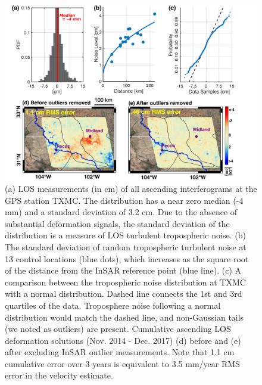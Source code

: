 \documentclass{utexasthesis}
\begin{document}
\begin{figure}[hbt!]
	\centering
	\includegraphics[width=0.95\linewidth]{paper1-permian/figures/figure2-outlier-removal-5panel.pdf}
	\caption[Noise measurement and tropospheric outlier removal comparison]{(a) LOS measurements (in cm) of all ascending interferograms at the GPS station TXMC. The distribution has a near zero median (-4 mm) and a standard deviation of 3.2 cm. Due to the absence of substantial deformation signals, the standard deviation of the distribution is a measure of LOS turbulent tropospheric noise. (b) The standard deviation of random tropospheric turbulent noise at 13 control locations (blue dots), which increases as the square root of the distance from the InSAR reference point (blue line). (c) A comparison between the tropospheric noise distribution at TXMC with a normal distribution. Dashed line connects the 1st and 3rd quartiles of the data. Troposphere noise following a normal distribution would match the dashed line, and non-Gaussian tails (we noted as outliers) are present. Cumulative ascending LOS deformation solutions (Nov. 2014 - Dec. 2017) (d) before and (e) after excluding InSAR outlier measurements. Note that 1.1 cm cumulative error over 3 years is equivalent to 3.5 mm/year RMS error in the velocity estimate.}
	\label{fig:outliers}
\end{figure}
\end{document}
